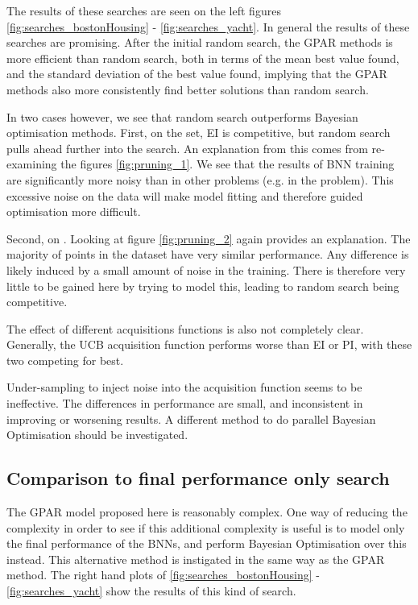 The results of these searches are seen on the left figures \ref{fig:searches_bostonHousing} - \ref{fig:searches_yacht}. In general the results of these searches are promising. After the initial random search, the GPAR methods is more efficient than random search, both in terms of the mean best value found, and the standard deviation of the best value found, implying that the GPAR methods also more consistently find better solutions than random search.

In two cases however, we see that random search outperforms Bayesian optimisation methods. First, on the \bostonname\: set, EI is competitive, but random search pulls ahead further into the search. An explanation from this comes from re-examining the figures \ref{fig:pruning_1}. We see that the results of BNN training are significantly more noisy than in other problems (e.g. in the \bostonname \: problem). This excessive noise on the data will make model fitting and therefore guided optimisation more difficult.

Second, on \yachtname. Looking at figure \ref{fig:pruning_2} again provides an explanation. The majority of points in the dataset have very similar performance. Any difference is likely induced by a small amount of noise in the training. There is therefore very little to be gained here by trying to model this, leading to random search being competitive.

The effect of different acquisitions functions is also not completely clear. Generally, the UCB acquisition function performs worse than EI or PI, with these two competing for best. 

Under-sampling to inject noise into the acquisition function seems to be ineffective. The differences in performance are small, and inconsistent in improving or worsening results. A different method to do parallel Bayesian Optimisation should be investigated.

\subsection{Comparison to final performance only search}

The GPAR model proposed here is reasonably complex. One way of reducing the complexity in order to see if this additional complexity is useful is to model only the final performance of the BNNs, and perform Bayesian Optimisation over this instead. This alternative method is instigated in the same way as the GPAR method.  The right hand plots of \ref{fig:searches_bostonHousing} - \ref{fig:searches_yacht} show the results of this kind of search. 

